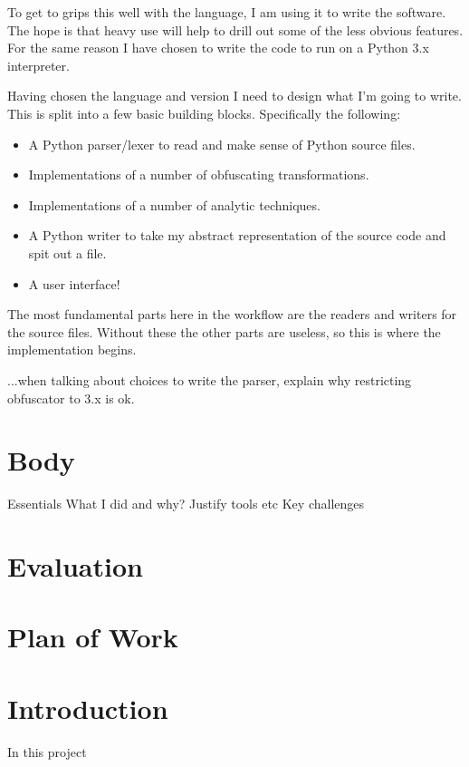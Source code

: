 \documentclass{report}
\begin{document}
To get to grips this well with the language, I am using it to write the software. The hope is that heavy use will help to
drill out some of the less obvious features. For the same reason I have chosen to write the code to run on a Python 3.x
interpreter.

Having chosen the language and version I need to design what I'm going to write. This is split into a few basic building
blocks. Specifically the following:

\begin{itemize}
\item A Python parser/lexer to read and make sense of Python source files.
\item Implementations of a number of obfuscating transformations.
\item Implementations of a number of analytic techniques.
\item A Python writer to take my abstract representation of the source code and spit out a file.
\item A user interface!
\end{itemize}

The most fundamental parts here in the workflow are the readers and writers for the source files.
Without these the other parts are useless, so this is where the implementation begins.

...when talking about choices to write the parser, explain why restricting obfuscator to 3.x is ok.

\section{Body}

Essentials
What I did and why?
Justify tools etc
Key challenges

\section{Evaluation}



\section{Plan of Work}

\section{Introduction}

In this project
\end{document}
